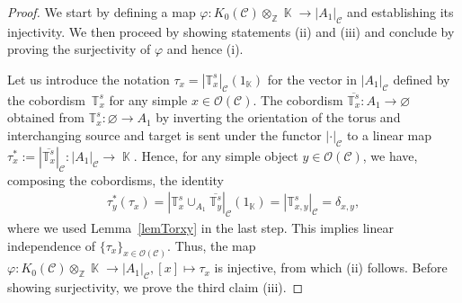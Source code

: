 \documentclass[10pt,a4paper]{amsart}
\DeclareMathOperator{\K}{\mathbb{K}}
\DeclareMathOperator{\calc}{\mathcal{C}}
\numberwithin{equation}{section}
\theoremstyle{definition}
\begin{document}
\begin{proof}
 We start by defining a map $\varphi\colon K_0(\mathcal{C}) \otimes_{\mathbb{Z}} \K \rightarrow |A_1|_{\mathcal{C}}$ and establishing its injectivity. We then proceed by showing statements (ii) and (iii) and conclude by proving the surjectivity of $\varphi$ and hence (i).

 Let us introduce the notation $\tau_x = |\mathbb{T}_x^s|_{\mathcal{C}}(1_{\K})$ for the vector in $|A_1|_{\calc}$ defined by the cobor\-dism~$\mathbb{T}_x^s$ for any simple $x \in \mathcal{O}(\mathcal{C})$. The cobordism $\overline{\mathbb{T}_x^s}\colon A_1 \rightarrow \varnothing $ obtained from $\mathbb{T}_x^s\colon \varnothing \rightarrow A_1$ by inverting the orientation of the torus and interchanging source and target is sent under the functor $|\cdot|_{\mathcal{C}}$ to a linear map $\tau_x^*:= \left|\overline{\mathbb{T}_x^s}\right|_{\mathcal{C}}\colon |A_1|_{\mathcal{C}} \rightarrow \K$. Hence, for any simple object $y \in \mathcal{O}(\mathcal{C})$, we have, composing the cobordisms, the identity
 \begin{align*}
 \tau_y^*(\tau_x) = \left| \mathbb{T}_x^s \cup_{A_1} \overline{\mathbb{T}_y^s}\right|_{\mathcal{C}}(1_{\K}) = |\mathbb{T}_{x,y}^s|_{\mathcal{C}} = \delta_{x,y},
 \end{align*}
 where we used Lemma~\ref{lemTorxy} in the last step. This implies linear independence of $\{\tau_x\}_{x \in \mathcal{O}(\mathcal{C})}$. Thus, the map $\varphi\colon K_0(\mathcal{C}) \otimes_{\mathbb{Z}} \K \rightarrow |A_1|_{\mathcal{C}}, [x] \mapsto \tau_x$ is injective, from which (ii) follows. Before showing surjectivity, we prove the third claim (iii).


\end{proof}
\end{document}

